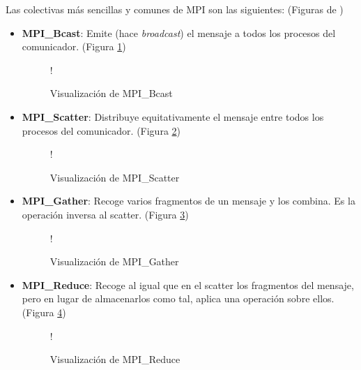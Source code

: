 Las colectivas más sencillas y comunes de MPI son las siguientes: (Figuras de \cite{cheung_mpi})
\begin{itemize}
  \item \textbf{MPI\_Bcast}: Emite (hace \textit{broadcast}) el mensaje a todos los procesos del comunicador. (Figura \ref{fig:mpi_bcast})
  
  \begin{figure}[H]
    \vspace*{0.5cm}
    \centering
     {!} {
    
    }
    \caption{Visualización de MPI\_Bcast}
    \label{fig:mpi_bcast}
  \end{figure}

  \item \textbf{MPI\_Scatter}: Distribuye equitativamente el mensaje entre todos los procesos del comunicador. (Figura \ref{fig:mpi_scatter})

  \begin{figure}[H]
    \vspace*{0.5cm}
    \centering
     {!} {
    
    }
    \caption{Visualización de MPI\_Scatter}
    \label{fig:mpi_scatter}
  \end{figure}

  \item \textbf{MPI\_Gather}: Recoge varios fragmentos de un mensaje y los combina. Es la operación inversa al scatter.  (Figura \ref{fig:mpi_gather})

  \begin{figure}[H]
    \vspace*{0.5cm}
    \centering
     {!} {
    
    }
    \caption{Visualización de MPI\_Gather}
    \label{fig:mpi_gather}
  \end{figure}

  \item \textbf{MPI\_Reduce}: Recoge al igual que en el scatter los fragmentos del mensaje, pero en lugar de almacenarlos como tal, aplica una operación sobre ellos. (Figura \ref{fig:mpi_reduce})

  \begin{figure}[H]
    \vspace*{0.5cm}
    \centering
     {!} {
    
    }
    \caption{Visualización de MPI\_Reduce}
    \label{fig:mpi_reduce}
  \end{figure}

\end{itemize}

